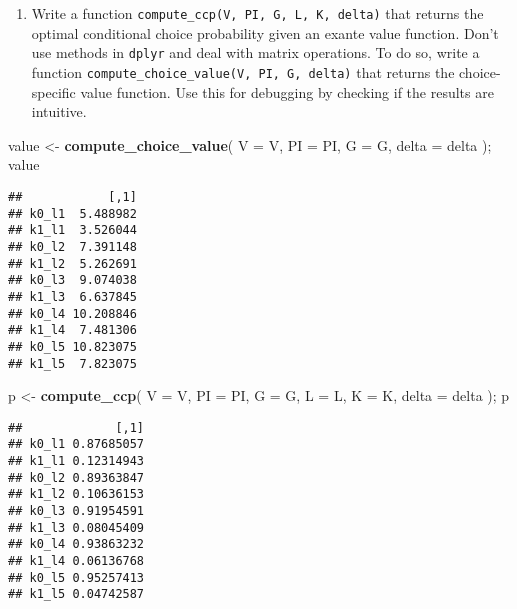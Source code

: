 \documentclass[
]{book}
\newenvironment{Shaded}{\begin{snugshade}}{\end{snugshade}}
\newcommand{\AttributeTok}[1]{\textcolor[rgb]{0.13,0.29,0.53}{#1}}
\newcommand{\FunctionTok}[1]{\textcolor[rgb]{0.13,0.29,0.53}{\textbf{#1}}}
\newcommand{\NormalTok}[1]{#1}
\newcommand{\OtherTok}[1]{\textcolor[rgb]{0.56,0.35,0.01}{#1}}
\providecommand{\tightlist}{%
  \setlength{\itemsep}{0pt}\setlength{\parskip}{0pt}}
\begin{document}
\begin{enumerate}
\def\labelenumi{\arabic{enumi}.}
\setcounter{enumi}{4}
\tightlist
\item
  Write a function \texttt{compute\_ccp(V,\ PI,\ G,\ L,\ K,\ delta)} that returns the optimal conditional choice probability given an exante value function. Don't use methods in \texttt{dplyr} and deal with matrix operations. To do so, write a function \texttt{compute\_choice\_value(V,\ PI,\ G,\ delta)} that returns the choice-specific value function. Use this for debugging by checking if the results are intuitive.
\end{enumerate}

\begin{Shaded}
\begin{Highlighting}[]
\NormalTok{value }\OtherTok{\textless{}{-}} 
  \FunctionTok{compute\_choice\_value}\NormalTok{(}
    \AttributeTok{V =}\NormalTok{ V, }
    \AttributeTok{PI =}\NormalTok{ PI, }
    \AttributeTok{G =}\NormalTok{ G, }
    \AttributeTok{delta =}\NormalTok{ delta}
\NormalTok{    ); }
\NormalTok{value}
\end{Highlighting}
\end{Shaded}

\begin{verbatim}
##            [,1]
## k0_l1  5.488982
## k1_l1  3.526044
## k0_l2  7.391148
## k1_l2  5.262691
## k0_l3  9.074038
## k1_l3  6.637845
## k0_l4 10.208846
## k1_l4  7.481306
## k0_l5 10.823075
## k1_l5  7.823075
\end{verbatim}

\begin{Shaded}
\begin{Highlighting}[]
\NormalTok{p }\OtherTok{\textless{}{-}} 
  \FunctionTok{compute\_ccp}\NormalTok{(}
    \AttributeTok{V =}\NormalTok{ V, }
    \AttributeTok{PI =}\NormalTok{ PI, }
    \AttributeTok{G =}\NormalTok{ G, }
    \AttributeTok{L =}\NormalTok{ L, }
    \AttributeTok{K =}\NormalTok{ K, }
    \AttributeTok{delta =}\NormalTok{ delta}
\NormalTok{    ); }
\NormalTok{p}
\end{Highlighting}
\end{Shaded}

\begin{verbatim}
##             [,1]
## k0_l1 0.87685057
## k1_l1 0.12314943
## k0_l2 0.89363847
## k1_l2 0.10636153
## k0_l3 0.91954591
## k1_l3 0.08045409
## k0_l4 0.93863232
## k1_l4 0.06136768
## k0_l5 0.95257413
## k1_l5 0.04742587
\end{verbatim}
\end{document}

